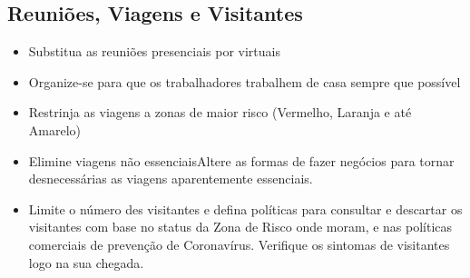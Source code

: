 \documentclass[onecolumn,journal]{IEEEtran}
\begin{document}
\begin{multicols}{2}
\section*{Reuniões, Viagens e Visitantes}
\begin{itemize}
\item Substitua as reuniões presenciais por virtuais
\item Organize-se para que os trabalhadores trabalhem de casa sempre que possível
\item Restrinja as viagens a zonas de maior risco (Vermelho, Laranja e até Amarelo)
\item Elimine viagens não essenciaisAltere as formas de fazer negócios para tornar desnecessárias as viagens aparentemente essenciais.
\item Limite o número des visitantes e defina políticas para consultar e descartar os visitantes com base no status da Zona de Risco onde moram, e nas políticas comerciais de prevenção de Coronavírus. Verifique os sintomas de visitantes logo na sua chegada.
\end{itemize}


\end{multicols}
\end{document}
